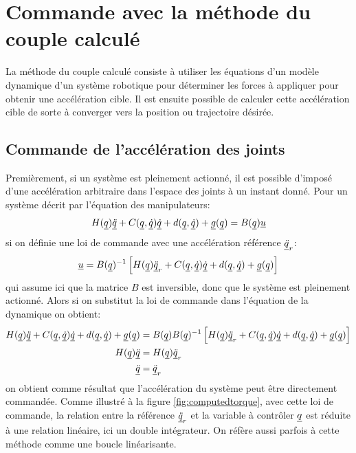 \section{Commande avec la méthode du couple calculé}

La méthode du couple calculé consiste à utiliser les équations d'un modèle dynamique d'un système robotique pour déterminer les forces à appliquer pour obtenir une accélération cible. Il est ensuite possible de calculer cette accélération cible de sorte à converger vers la position ou trajectoire désirée.





\subsection{Commande de l'accélération des joints}

Premièrement, si un système est pleinement actionné, il est possible d'imposé d'une accélération arbitraire dans l'espace des joints à un instant donné. Pour un système décrit par l'équation des manipulateurs:
\begin{align}
H(\underline{q}) \underline{\ddot{q}} + C(\underline{q},\underline{\dot{q}}) \underline{\dot{q}} + d(\underline{q}, \underline{\dot{q}}) + \underline{g}(\underline{q}) = B(\underline{q}) \underline{u} 
\end{align}
si on définie une loi de commande avec une accélération référence $\underline{\ddot{q}}_r$:
\begin{align}
\underline{u} = B(\underline{q})^{-1} \left[  H(\underline{q}) \underline{\ddot{q}}_r + C(\underline{q},\underline{\dot{q}}) \underline{\dot{q}} + d(\underline{q}, \underline{\dot{q}}) + \underline{g}(\underline{q}) \right]
\end{align}
qui assume ici que la matrice $B$ est inversible, donc que le système est pleinement actionné. Alors si on substitut la loi de commande dans l'équation de la dynamique on obtient:
\begin{align}
H(\underline{q}) \underline{\ddot{q}} + C(\underline{q},\underline{\dot{q}}) \underline{\dot{q}} + d(\underline{q}, \underline{\dot{q}}) + \underline{g}(\underline{q}) &= B(\underline{q}) B(\underline{q})^{-1} \left[  H(\underline{q}) \underline{\ddot{q}}_r + C(\underline{q},\underline{\dot{q}}) \underline{\dot{q}} + d(\underline{q}, \underline{\dot{q}}) + \underline{g}(\underline{q}) \right]  \\
H(\underline{q}) \underline{\ddot{q}} &= H(\underline{q}) \underline{\ddot{q}}_r \\
\underline{\ddot{q}} &= \underline{\ddot{q}}_r
\end{align}
on obtient comme résultat que l'accélération du système peut être directement commandée. Comme illustré à la figure \ref{fig:computedtorque}, avec cette loi de commande, la relation entre la référence $\underline{\ddot{q}}_r$ et la variable à contrôler $\underline{q}$ est réduite à une relation linéaire, ici un double intégrateur. On réfère aussi parfois à cette méthode comme une boucle linéarisante.

